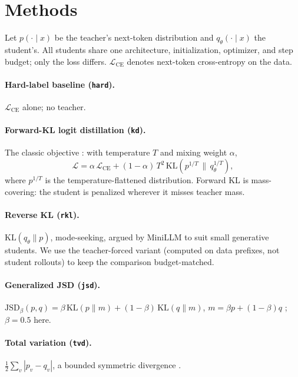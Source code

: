 \documentclass[11pt]{article}
\begin{document}
\section{Methods}
\label{sec:methods}
Let $p(\cdot \mid x)$ be the teacher's next-token distribution and
$q_\theta(\cdot \mid x)$ the student's. All students share one
architecture, initialization, optimizer, and step budget; only the loss
differs. $\mathcal{L}_{\mathrm{CE}}$ denotes next-token cross-entropy on
the data.

\paragraph{Hard-label baseline (\texttt{hard}).}
$\mathcal{L}_{\mathrm{CE}}$ alone; no teacher.

\paragraph{Forward-KL logit distillation (\texttt{kd}).}
The classic objective \cite{hinton2015distilling}: with temperature $T$
and mixing weight $\alpha$,
\begin{equation}
\mathcal{L} = \alpha\,\mathcal{L}_{\mathrm{CE}}
 + (1-\alpha)\,T^2\,\mathrm{KL}\!\left(p^{1/T} \,\|\, q_\theta^{1/T}\right),
\end{equation}
where $p^{1/T}$ is the temperature-flattened distribution. Forward KL is
mass-covering: the student is penalized wherever it misses teacher mass.

\paragraph{Reverse KL (\texttt{rkl}).}
$\mathrm{KL}(q_\theta \| p)$, mode-seeking, argued by MiniLLM
\cite{gu2024minillm} to suit small generative students. We use the
teacher-forced variant (computed on data prefixes, not student rollouts)
to keep the comparison budget-matched.

\paragraph{Generalized JSD (\texttt{jsd}).}
$\mathrm{JSD}_\beta(p,q) = \beta\,\mathrm{KL}(p\|m) +
(1-\beta)\,\mathrm{KL}(q\|m)$, $m=\beta p + (1-\beta)q$ \cite{agarwal2024gkd};
$\beta{=}0.5$ here.

\paragraph{Total variation (\texttt{tvd}).}
$\tfrac12\sum_v |p_v - q_v|$, a bounded symmetric divergence
\cite{wen2023fdivergence}.
\end{document}
